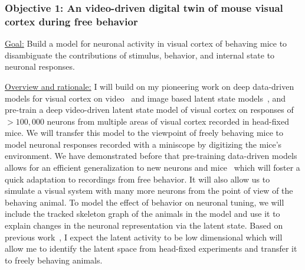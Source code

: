 \documentclass[COG,11pt]{ercgrant}
\begin{document}



\subsubsection{Objective 1: An video-driven digital twin of mouse visual cortex during free behavior\hfill{}}
\underline{Goal:} Build a model for neuronal activity in visual cortex of behaving mice to disambiguate the contributions of stimulus, behavior, and internal state to neuronal responses. 


\underline{Overview and rationale:}
I will build on my pioneering work on deep data-driven models for visual cortex on video~\parencite{Sinz2018-sk} and image based latent state models~\parencite{Bashiri2021-or}, and pre-train a deep video-driven latent state model of visual cortex on responses of $>100,000$ neurons from multiple areas of visual cortex recorded in head-fixed mice.
We will transfer this model to the viewpoint of freely behaving mice to model neuronal responses recorded with a miniscope by digitizing the mice's environment. 
We have demonstrated before that pre-training data-driven models allows for an efficient generalization to new neurons and mice~\parencite{Lurz2020-ua} which will foster a quick adaptation to recordings from free behavior. 
It will also allow us to simulate a visual system with many more neurons from the point of view of the behaving animal.
To model the effect of behavior on neuronal tuning, we will include the tracked skeleton graph of the animals in the model and use it to explain changes in the neuronal representation via the latent state.
Based on previous work~\parencite{Musall2019-kd, Stringer2019-lt}, I expect the latent activity to be low dimensional which will allow me to identify the latent space from head-fixed experiments and transfer it to freely behaving animals. 
\end{document}
